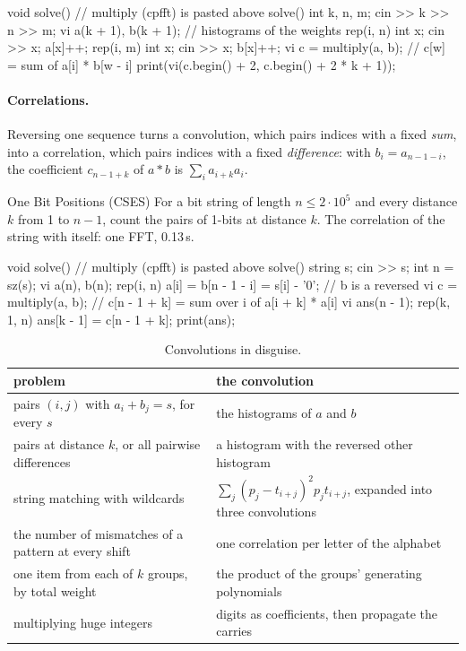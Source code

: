 \begin{code}
void solve() {  // multiply (cpfft) is pasted above solve()
    int k, n, m;
    cin >> k >> n >> m;
    vi a(k + 1), b(k + 1);  // histograms of the weights
    rep(i, n) {
        int x;
        cin >> x;
        a[x]++;
    }
    rep(i, m) {
        int x;
        cin >> x;
        b[x]++;
    }
    vi c = multiply(a, b);  // c[w] = sum of a[i] * b[w - i]
    print(vi(c.begin() + 2, c.begin() + 2 * k + 1));
}
\end{code}

\paragraph{Correlations.} Reversing one sequence turns a convolution, which pairs indices with a fixed \emph{sum}, into a correlation,
which pairs indices with a fixed \emph{difference}: with $b_i = a_{n-1-i}$, the coefficient $c_{n-1+k}$ of $a * b$ is $\sum_i a_{i+k}
a_i$.

\begin{problem}{One Bit Positions (CSES)}
For a bit string of length $n \le 2 \cdot 10^5$ and every distance $k$ from 1 to $n - 1$, count the pairs of 1-bits at distance $k$.
\solution The correlation of the string with itself: one FFT, 0.13\,s.
\end{problem}

\begin{code}
void solve() {  // multiply (cpfft) is pasted above solve()
    string s;
    cin >> s;
    int n = sz(s);
    vi a(n), b(n);
    rep(i, n) a[i] = b[n - 1 - i] = s[i] - '0';  // b is a reversed
    vi c = multiply(a, b);  // c[n - 1 + k] = sum over i of a[i + k] * a[i]
    vi ans(n - 1);
    rep(k, 1, n) ans[k - 1] = c[n - 1 + k];
    print(ans);
}
\end{code}

\begin{table}[htbp]
\centering\small
\begin{tabularx}{\linewidth}{@{}>{\raggedright\arraybackslash}p{6.4cm}X@{}}
\toprule
problem & the convolution \\
\midrule
pairs $(i, j)$ with $a_i + b_j = s$, for every $s$ & the histograms of $a$ and $b$ \\
pairs at distance $k$, or all pairwise differences & a histogram with the reversed other histogram \\
string matching with wildcards & $\sum_j (p_j - t_{i+j})^2 p_j t_{i+j}$, expanded into three convolutions \\
the number of mismatches of a pattern at every shift & one correlation per letter of the alphabet \\
one item from each of $k$ groups, by total weight & the product of the groups' generating polynomials \\
multiplying huge integers & digits as coefficients, then propagate the carries \\
\bottomrule
\end{tabularx}
\caption{Convolutions in disguise.}
\label{tab:convapps}
\end{table}

